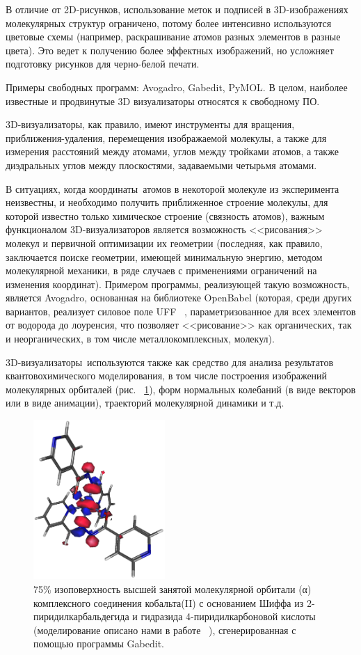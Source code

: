 \documentclass[10pt, a5paper]{article}
\begin{document}
В отличие от 2D-рисунков, использование меток и подписей в 3D-изображениях молекулярных структур ограничено, потому более интенсивно используются цветовые схемы (например, раскрашивание атомов разных элементов в разные цвета). Это ведет к получению более эффектных изображений, но усложняет подготовку рисунков для черно-белой печати.

Примеры свободных программ: Avogadro, Gabedit, PyMOL. В целом, наиболее известные и продвинутые 3D визуализаторы относятся к свободному ПО.

3D-визуализаторы, как правило, имеют инструменты для вращения, приближения-удаления, перемещения изображаемой молекулы, а также для измерения расстояний между атомами, углов между тройками атомов, а также диэдральных углов между плоскостями, задаваемыми четырьмя атомами.

В ситуациях, когда координаты атомов в некоторой молекуле из эксперимента неизвестны, и необходимо получить приближенное строение молекулы, для которой известно только химическое строение (связность атомов), важным функционалом 3D-визуализаторов является возможность <<рисования>> молекул и первичной оптимизации их геометрии (последняя, как правило, заключается поиске геометрии, имеющей минимальную энергию, методом молекулярной механики, в ряде случаев с применениями ограничений на изменения координат). Примером программы, реализующей такую возможность, является Avogadro, основанная на библиотеке OpenBabel (которая, среди других вариантов, реализует силовое поле UFF ~\cite{Litvenenka4}, параметризованное для всех элементов от водорода до лоуренсия, что позволяет <<рисование>> как органических, так и неорганических, в том числе металлокомплексных, молекул).

3D-визуализаторы используются также как средство для анализа результатов квантовохимического моделирования, в том числе построения изображений молекулярных орбиталей (рис. ~\ref{Litvenenka4}), форм нормальных колебаний (в виде векторов или в виде анимации), траекторий молекулярной динамики и т.д.

\begin{figure}[h!]
  \centering
  \includegraphics[width=5cm]{20_2016_Litvenenka4.png}
  \caption{75\% изоповерхность высшей занятой молекулярной орбитали (α) комплексного соединения кобальта(II) с основанием Шиффа из 2-пиридилкарбальдегида и гидразида 4-пиридилкарбоновой кислоты (моделирование описано нами в работе ~\cite{Litvenenka3}), сгенерированная с помощью программы Gabedit.}
  \label{Litvenenka4}
\end{figure} 
\end{document}

